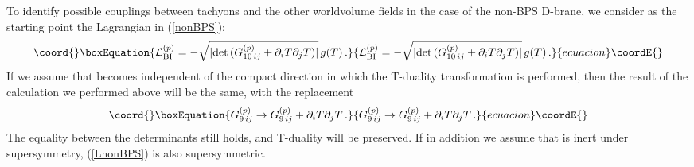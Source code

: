 \documentclass[12pt,a4paper]{article}
\begin{document}
To identify possible couplings between tachyons and the other worldvolume
 fields in the case of the non-BPS D-brane, we consider as
 the starting point the Lagrangian in (\ref{nonBPS}):
\begin{equation}\coord{}\boxEquation{
\label{LnonBPS}
   {\cal L}_{\rm BI}^{(p)} = -\sqrt{ |{\rm det}\, ({G}^{(p)}_{10\,ij} +
     \partial_iT\partial_jT)|}\,g(T)\,.
}{
{\cal L}_{\rm BI}^{(p)} = -\sqrt{ |{\rm det}\, ({G}^{(p)}_{10\,ij} +
     \partial_iT\partial_jT)|}\,g(T)\,.
}{ecuacion}\coordE{}\end{equation}
If we assume that \coordHE{} becomes independent of the compact direction in which
 the T-duality transformation is performed, then the result of the
 calculation we performed above will be the same, with the replacement
\begin{equation}\coord{}\boxEquation{
   G^{(p)}_{9\,ij} \to G^{(p)}_{9\,ij} + \partial_iT\partial_jT\,.
}{
   G^{(p)}_{9\,ij} \to G^{(p)}_{9\,ij} + \partial_iT\partial_jT\,.
}{ecuacion}\coordE{}\end{equation}
The equality between the determinants  still holds, and T-duality
 will be preserved. If in addition we assume that \coordHE{} is inert under
 supersymmetry, (\ref{LnonBPS}) is also supersymmetric.
\end{document}
